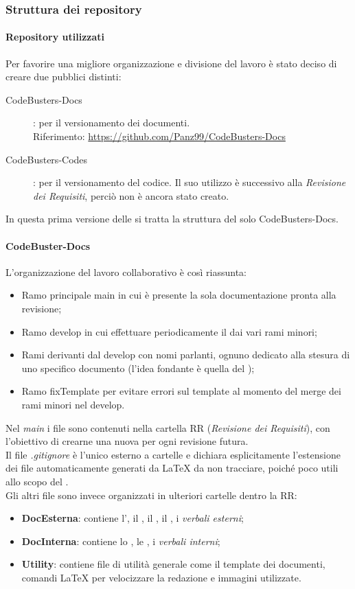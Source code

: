 \subsubsection{Struttura dei repository}
\paragraph{Repository utilizzati}
Per favorire una migliore organizzazione e divisione del lavoro è stato deciso di creare due  pubblici distinti:
\begin{description}
	\item[CodeBusters-Docs] : per il versionamento dei documenti. \\
	Riferimento: \url{https://github.com/Panz99/CodeBusters-Docs}
	\item[CodeBusters-Codes] : per il versionamento del codice. Il suo utilizzo è successivo alla \textit{Revisione dei Requisiti}, perciò non è ancora stato creato. 
\end{description}
In questa prima versione delle \NdPv si tratta la struttura del solo  CodeBusters-Docs. 

\paragraph{CodeBuster-Docs}
L'organizzazione del lavoro collaborativo è così riassunta:
\begin{itemize}
	\item Ramo principale main in cui è presente la sola documentazione pronta alla revisione;	
	\item Ramo develop in cui effettuare periodicamente il  dai vari rami minori;
	\item Rami derivanti dal develop con nomi parlanti, ognuno dedicato alla stesura di uno specifico documento (l'idea fondante è quella del );
	\item Ramo fixTemplate per evitare errori sul template al momento del merge dei rami minori nel develop.
\end{itemize}
Nel \textit{main} i file sono contenuti nella cartella RR (\textit{Revisione dei Requisiti}), con l'obiettivo di crearne una nuova per ogni revisione futura. \\
Il file \textit{.gitignore} è l'unico esterno a cartelle e dichiara esplicitamente l'estensione dei file automaticamente generati da \LaTeX{} da non tracciare, poiché poco utili allo scopo del . \\
Gli altri file sono invece organizzati in ulteriori cartelle dentro la RR:
\begin{itemize}
	\item \textbf{DocEsterna}: contiene l'\AdRv{}, il \PdPv{}, il \PdQv, il \Glossariov, i \textit{verbali esterni};
	\item \textbf{DocInterna}: contiene lo \SdFv, le \NdPv, i \textit{verbali interni};
	\item \textbf{Utility}: contiene file di utilità generale come il template dei documenti, comandi \LaTeX{} per velocizzare la redazione e immagini utilizzate.
\end{itemize}
	
